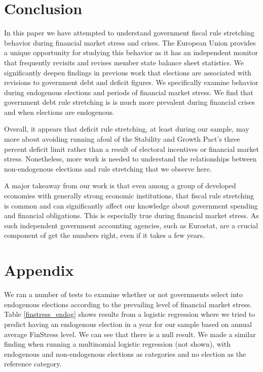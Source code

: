 \documentclass[]{article}
\begin{document}
\section{Conclusion}

In this paper we have attempted to understand government fiscal rule stretching behavior during financial market stress and crises. The European Union provides a unique opportunity for studying this behavior as it has an independent monitor that frequently revisits and revises member state balance sheet statistics. We significantly deepen findings in previous work that elections are associated with revisions to government debt and deficit figures. We specifically examine behavior during endogenous elections and periods of financial market stress. We find that government debt rule stretching is is much more prevalent during financial crises and when elections are endogenous.

Overall, it appears that deficit rule stretching, at least during our sample, may more about avoiding running afoul of the Stability and Growth Pact's three percent deficit limit rather than a result of electoral incentives or financial market stress. Nonetheless, more work is needed to understand the relationships between non-endogenous elections and rule stretching that we observe here.

A major takeaway from our work is that even among a group of developed economies with generally strong economic institutions, that fiscal rule stretching is common and can significantly affect our knowledge about government spending and financial obligations. This is especially true during financial market stress. As such independent government accounting agencies, such as Eurostat, are a crucial component of get the numbers right, even if it takes a few years.


\clearpage




\clearpage

\section*{Appendix}

We ran a number of tests to examine whether or not governments select into endogenous elections according to the prevailing level of financial market stress. Table \ref{finstress_endog} shows results from a logistic regression where we tried to predict having an endogenous election in a year for our sample based on annual average FinStress level. We can see that there is a null result. We made a similar finding when running a multinomial logistic regression (not shown), with endogenous and non-endogenous elections as categories and no election as the reference category.


\end{document}
